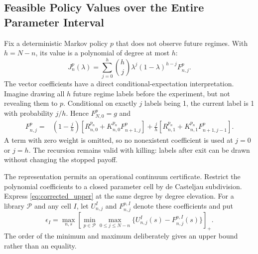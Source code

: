 \subsection{Feasible Policy Values over the Entire Parameter Interval}
Fix a deterministic Markov policy $p$ that does not observe future regimes. With $h=N-n$, its value is a polynomial of degree at most $h$:
\begin{equation}
 J_n^p(\lambda)=\sum_{j=0}^{h}{h\choose j}\lambda^j(1-\lambda)^{h-j}F_{n,j}^p.
 \label{eq:bernstein_policy}
\end{equation}
The vector coefficients have a direct conditional-expectation interpretation. Imagine drawing all $h$ future regime labels before the experiment, but not revealing them to $p$. Conditional on exactly $j$ labels being 1, the current label is 1 with probability $j/h$. Hence $F_{N,0}^p=g$ and
\begin{align}
 F_{n,j}^p={}&\left(1-\frac jh\right)
 \left[R_{n,0}^{p_n}+K_{n,0}^{p_n}F_{n+1,j}^p\right]
 +\frac jh\left[R_{n,1}^{p_n}+K_{n,1}^{p_n}F_{n+1,j-1}^p\right].
 \label{eq:bernstein_recursion}
\end{align}
A term with zero weight is omitted, so no nonexistent coefficient is used at $j=0$ or $j=h$. The recursion remains valid with killing: labels after exit can be drawn without changing the stopped payoff.

The representation permits an operational continuum certificate. Restrict the polynomial coefficients to a closed parameter cell by de Casteljau subdivision. Express \eqref{eq:corrected_upper} at the same degree by degree elevation. For a library $\mathcal P$ and any cell $I$, let $U_{n,j}^I$ and $F_{n,j}^{p,I}$ denote these coefficients and put
\begin{equation}
 \epsilon_I=\max_{n,s}\left[\min_{p\in\mathcal P}
             \max_{0\leq j\leq N-n}
             \{U_{n,j}^I(s)-F_{n,j}^{p,I}(s)\}\right]_+.
 \label{eq:bernstein_certificate}
\end{equation}
The order of the minimum and maximum deliberately gives an upper bound rather than an equality.

